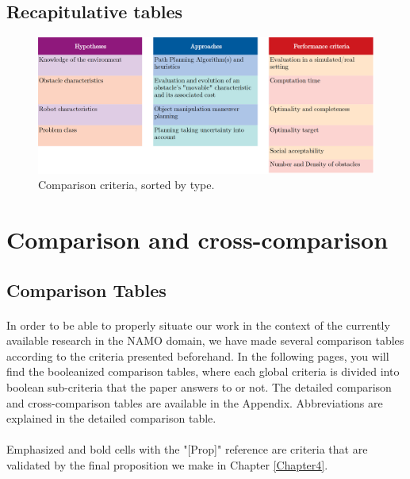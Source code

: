 \subsection{Recapitulative tables}

\begin{figure}[H]
\centering
\includegraphics[width=13cm]{Comparison_Table/01_comparison_criteria}
\decoRule
\caption[Comparison criteria listing]{Comparison criteria, sorted by type.}
\label{fig:comparison_criteria}
\end{figure}

\clearpage

\section{Comparison and cross-comparison}

\subsection{Comparison Tables}

\paragraph{} In order to be able to properly situate our work in the context of the currently available research in the NAMO domain, we have made several comparison tables according to the criteria presented beforehand. In the following pages, you will find the booleanized comparison tables, where each global criteria is divided into boolean sub-criteria that the paper answers to or not. The detailed comparison and cross-comparison tables are available in the  Appendix. Abbreviations are explained in the detailed comparison table.

\paragraph{} Emphasized and bold cells with the "[Prop]" reference are criteria that are validated by the final proposition we make in Chapter \ref{Chapter4}.

